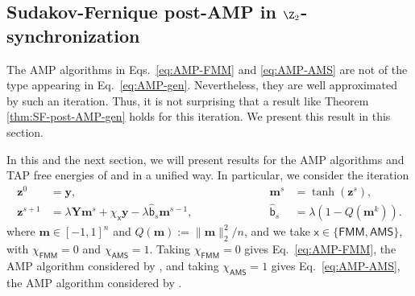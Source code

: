 \documentclass[]{article}
\def\sx{{\mathsf x}}
\def\by{{\boldsymbol y}}
\def\bz{{\boldsymbol z}}
\def\by{{\boldsymbol y}}
\def\bz{{\boldsymbol z}}
\def\bY{{\boldsymbol Y}}
\def\bbm{{\boldsymbol m}}
\def\sbhat{\widehat{\mathsf{b}}{}}
\def\FMM{\mathsf{FMM}}
\def\AMS{\mathsf{AMS}}
\begin{document}
\subsection{Sudakov-Fernique post-AMP in $\Z_2$-synchronization}

The AMP algorithms in Eqs.~\eqref{eq:AMP-FMM} and \eqref{eq:AMP-AMS} are not of the type appearing in Eq.~\eqref{eq:AMP-gen}.
Nevertheless, they are well approximated by such an iteration.
Thus, it is not surprising that a result like Theorem \ref{thm:SF-post-AMP-gen} holds for this iteration.
We present this result in this section.

In this and the next section, we will present results for the AMP algorithms and TAP free energies of \cite{fanMeiMontanari2021} and \cite{AlaouiMontanariSelke2022} in a unified way. 
In particular, we consider the iteration
\begin{equation}\label{eq:AMP-Z2}
\begin{aligned}
    \bz^0 &= \by,
    \qquad\qquad\qquad&
    \bbm^s &= \tanh(\bz^s),
    \\
    \bz^{s+1} &= \lambda \bY \bbm^s + \chi_{\sx} \by - \lambda \sbhat_s\bbm^{s-1},
    \qquad\qquad\qquad
    &
    \sbhat_s &= \lambda(1 - Q(\bbm^k)).
\end{aligned}
\end{equation}
where $\bbm \in [-1,1]^n$ and $Q(\bbm) := \| \bbm \|_2^2 / n$,
and we take $\sx \in \{ \FMM, \AMS \}$,
with $\chi_{\FMM} = 0$ and $\chi_{\AMS} = 1$.
Taking $\chi_{\FMM} = 0$ gives Eq.~\eqref{eq:AMP-FMM}, the AMP algorithm considered by \cite{fanMeiMontanari2021,celentanoFanMei2021},
and taking $\chi_{\AMS} = 1$ gives Eq.~\eqref{eq:AMP-AMS}, the AMP algorithm considered by \cite{AlaouiMontanariSelke2022}.
\end{document}
